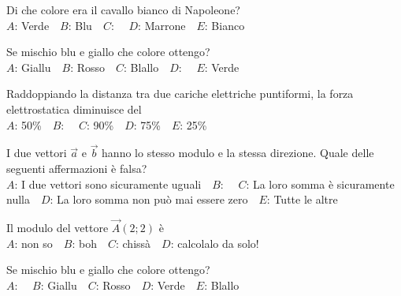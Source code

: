 \mcquestionfooter



\def\mcquestionnumber{8}


\mcquestionheader Di che colore era il cavallo bianco di Napoleone?\\
{$A$}: Verde\ \ {$B$}: Blu\ \ {$C$}: \ \ {$D$}: Marrone\ \ {$E$}: Bianco\ \ 

\mcquestionfooter



\def\mcquestionnumber{9}


\mcquestionheader Se mischio blu e giallo che colore ottengo?\\
{$A$}: Giallu\ \ {$B$}: Rosso\ \ {$C$}: Blallo\ \ {$D$}: \ \ {$E$}: Verde\ \ 

\mcquestionfooter



\def\mcquestionnumber{10}


\mcquestionheader Raddoppiando la distanza tra due cariche elettriche puntiformi, la forza elettrostatica diminuisce del\\
{$A$}: 50\%\ \ {$B$}: \ \ {$C$}: 90\%\ \ {$D$}: 75\%\ \ {$E$}: 25\%\ \ 

\mcquestionfooter



\def\mcquestionnumber{11}


\mcquestionheader I due vettori $\vec{a}$ e $\vec{b}$ hanno lo stesso modulo e la stessa direzione. Quale delle seguenti affermazioni è falsa?\\
{$A$}: I due vettori sono sicuramente uguali\ \ {$B$}: \ \ {$C$}: La loro somma è sicuramente nulla\ \ {$D$}: La loro somma non può mai essere zero\ \ {$E$}: Tutte le altre\ \ 

\mcquestionfooter



\def\mcquestionnumber{12}


\mcquestionheader Il modulo del vettore $\vec{A}(2;2)$ è\\
{$A$}: non so\ \ {$B$}: boh\ \ {$C$}: chissà\ \ {$D$}: calcolalo da solo!\ \ 

\mcquestionfooter



\mcpaperfooter

\def\mcserialnumber{17}
\mcpaperheader


\def\mcquestionnumber{1}


\mcquestionheader Se mischio blu e giallo che colore ottengo?\\
{$A$}: \ \ {$B$}: Giallu\ \ {$C$}: Rosso\ \ {$D$}: Verde\ \ {$E$}: Blallo\ \ 

